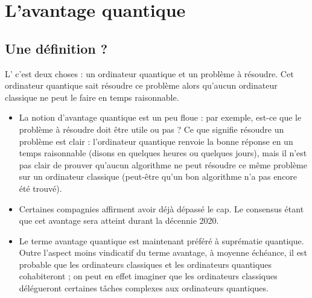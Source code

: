 \documentclass[11pt,class=report,crop=false]{standalone}
\begin{document}






\section{L'avantage quantique}


\subsection{Une définition ?}

L' c'est deux choses : un ordinateur quantique et un problème à résoudre. Cet ordinateur quantique sait résoudre ce problème alors qu'aucun ordinateur classique ne peut le faire en temps raisonnable.

\medskip

\begin{itemize}
  \item La notion d'avantage quantique est un peu floue : par exemple, est-ce que le problème à résoudre doit être utile ou pas ? 
Ce que signifie résoudre un problème est clair : l'ordinateur quantique renvoie la bonne réponse en un temps raisonnable (disons en quelques heures ou quelques jours), mais il n'est pas clair de prouver qu'aucun algorithme ne peut résoudre ce même problème sur un ordinateur classique (peut-être qu'un bon algorithme n'a pas encore été trouvé).

  \item Certaines compagnies affirment avoir déjà dépassé le cap. Le consensus étant que cet avantage sera atteint durant la décennie 2020.

  \item Le terme \og{}avantage quantique\fg{} est maintenant préféré à \og{}suprématie quantique\fg{}. 
Outre l'aspect moins vindicatif du terme \og{}avantage\fg{}, à moyenne échéance, il est probable que les ordinateurs classiques et les ordinateurs quantiques cohabiteront ; on peut en effet imaginer que les ordinateurs classiques délégueront certaines tâches complexes aux ordinateurs quantiques.
\end{itemize}
\end{document}
